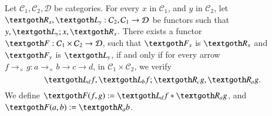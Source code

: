 \documentclass [12pt]{book}
\begin{document}
\begin{lemma nat t2}Let $\mathcal C_1,\mathcal C_2,\mathcal D$ be categories. For every $x$ in $\mathcal C_1$, and $y$ in $\mathcal C_2$, let $\textgoth R _x,\textgoth L_y:\mathcal C_2,\mathcal C_1\rightarrow\mathcal D$ be functors such that $y,\textgoth L_y;x,\textgoth R_x$. There exists a functor $\textgoth F:\mathcal C_1\times\mathcal C_2\rightarrow\mathcal D$, such that $\textgoth F_x$ is $\textgoth R_x$ and $\textgoth F_y$ is $\textgoth L_y$, if and only if for every arrow $f\rightarrow_\times g:a\rightarrow_\times b\longrightarrow c\rightarrow d$, in $\mathcal C_1\times\mathcal C_2$, we verify \begin{equation}\textgoth L_df,\textgoth L_bf;\textgoth R_cg,\textgoth R_ag.\label{eq lem cat}\end{equation} We define $\textgoth F(f,g):=\textgoth L_df*\textgoth R_ag$, and $\textgoth F(a,b):=\textgoth R_ab$.\end{lemma nat t2}
\end{document}
